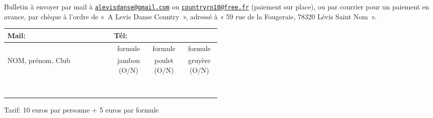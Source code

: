 \documentclass[12pt,a4paper]{article}
\begin{document}
Bulletin à envoyer par mail à
\href{mailto:alevisdanse@gmail.com?subject=Inscription Bal 13
  Decembre}{\texttt{\color{blue!50!black}alevisdanse@gmail.com}} ou
\href{mailto:countryrn10@free.fr}{\texttt{\color{blue!50!black}countryrn10@free.fr}}
(paiement sur place), ou par courrier pour un paiement en avance, par
chèque à l'ordre de «~A Levis Danse Country~», adressé à « 59 rue de
la Fougeraie, 78320 Lévis Saint Nom~».
\begin{center}
  \begin{tabular}{|p{0.5\linewidth}|c|c|c|}
    \hline
    \multicolumn{1}{|l|}{Mail:} & \multicolumn{3}{l|}{Tél:} \\
\hline\hline
     & formule & formule & formule \\
  NOM, prénom, Club & jambon (O/N) & poulet (O/N) & gruyère (O/N) \\
  \hline
  & & & \\
  & & & \\
  \hline
  & & & \\
  & & & \\
  \hline
  & & & \\
  & & & \\
  \hline
  & & & \\
  & & & \\
  \hline
\end{tabular}
\end{center}
Tarif: 10 euros par personne + 5 euros par formule
\end{document}
